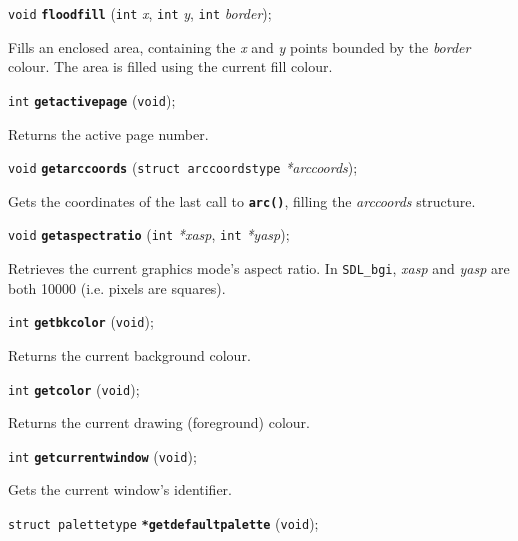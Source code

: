 \documentclass[a4paper,11pt]{article}
\newcommand{\SDLbgi}{\texttt{SDL\_bgi}}
\newcommand{\V}{\texttt{void}}      %
\newcommand{\I}{\texttt{int}}       %
\newcommand{\func}[1]{\textbf{\texttt{#1}}}  %
\newcommand{\A}[1]{\emph{#1}}       %
\newenvironment{bgi}
{ %
  \begin{snugshade}
}
{ %
  \end{snugshade}
}
\begin{document}

\begin{bgi}
\V{} \func{floodfill} (\I{} \A{x}, \I{} \A{y}, \I{} \A{border});
\end{bgi}

Fills an enclosed area, containing the \A{x} and \A{y} points bounded
by the \A{border} colour. The area is filled using the current fill
colour.


\begin{bgi}
\I{} \func{getactivepage} (\V{});
\end{bgi}

Returns the active page number.


\begin{bgi}
\V{} \func{getarccoords} (\texttt{struct arccoordstype} \A{*arccoords});
\end{bgi}

Gets the coordinates of the last call to \func{arc()}, filling the
\A{arccoords} structure.


\begin{bgi}
\V{} \func{getaspectratio} (\I{} \A{*xasp}, \I{} \A{*yasp});
\end{bgi}

Retrieves the current graphics mode's aspect ratio. In \SDLbgi,
\A{xasp} and \A{yasp} are both 10000 (i.e. pixels are squares).


\begin{bgi}
\I{} \func{getbkcolor} (\V{});
\end{bgi}

Returns the current background colour.


\begin{bgi}
\I{} \func{getcolor} (\V{});
\end{bgi}

Returns the current drawing (foreground) colour.


\begin{bgi}
\I{} \func{getcurrentwindow} (\V{});
\end{bgi}

Gets the current window's identifier.


\begin{bgi}
\texttt{struct palettetype} \func{*getdefaultpalette} (\V{});
\end{bgi}
\end{document}
